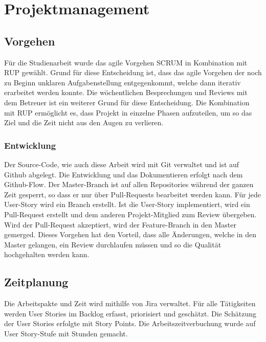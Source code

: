 
\section{Projektmanagement}
\label{sec:Projektmanagement}

\subsection{Vorgehen}
\label{sub:Vorgehen}

Für die Studienarbeit wurde das agile Vorgehen SCRUM in Kombination mit \acs{RUP} gewählt. Grund für diese Entscheidung ist, dass das agile Vorgehen der noch zu Beginn unklaren Aufgabenstellung entgegenkommt, welche dann iterativ erarbeitet werden konnte. Die wöchentlichen Besprechungen und Reviews mit dem Betreuer ist ein weiterer Grund für diese Entscheidung. Die Kombination mit \acs{RUP} ermöglicht es, dass Projekt in einzelne Phasen aufzuteilen, um so das Ziel und die Zeit nicht aus den Augen zu verlieren.

\subsubsection{Entwicklung}
\label{sub:Entwicklung}

Der Source-Code, wie auch diese Arbeit wird mit Git verwaltet und ist auf Github abgelegt. Die Entwicklung und das Dokumentieren erfolgt nach dem Github-Flow. Der Master-Branch ist auf allen Repositories während der ganzen Zeit gesperrt, so dass er nur über Pull-Requests bearbeitet werden kann. Für jede User-Story wird ein Branch erstellt. Ist die User-Story implementiert, wird ein Pull-Request erstellt und dem anderen Projekt-Mitglied zum Review übergeben. Wird der Pull-Request akzeptiert, wird der Feature-Branch in den Master gemerged. Dieses Vorgehen hat den Vorteil, dass alle Änderungen, welche in den Master gelangen, ein Review durchlaufen müssen und so die Qualität hochgehalten werden kann.


\subsection{Zeitplanung}
\label{sub:Zeitplanung}

Die Arbeitspakte und Zeit wird mithilfe von Jira verwaltet. Für alle Tätigkeiten werden User Stories im Backlog erfasst, priorisiert und geschätzt. Die Schätzung der User Stories erfolgte mit Story Points. Die Arbeitszeitverbuchung wurde auf User Story-Stufe mit Stunden gemacht. 

